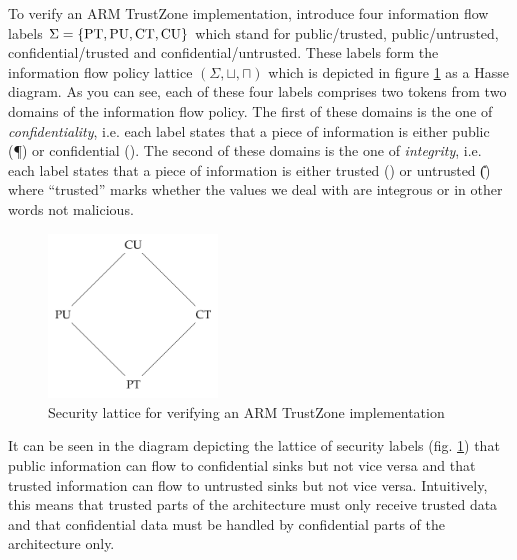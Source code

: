 \begin{example}
    To verify an ARM TrustZone implementation, \citeauthor{Ferraiuolo17} introduce four information flow labels $ \Sigma = \{ \text{PT}, \text{PU}, \text{CT}, \text{CU} \} $ which stand for public/trusted, public/untrusted, confidential/trusted and confidential/untrusted.
    These labels form the information flow policy lattice $ (\Sigma, \sqcup, \sqcap) $ which is depicted in figure \ref{fig:sec-lattice} as a Hasse diagram.
    As you can see, each of these four labels comprises two tokens from two domains of the information flow policy.
    The first of these domains is the one of \textit{confidentiality}, i.e. each label states that a piece of information is either public (\P{}) or confidential (\C{}).
    The second of these domains is the one of \textit{integrity}, i.e. each label states that a piece of information is either trusted (\T{}) or untrusted (\U{}) where \enquote{trusted} marks whether
    the values we deal with are integrous or in other words not malicious.

    \begin{figure}
        \centering
        \includegraphics[width=0.4\textwidth]{figures/ifp-lattice.png}
        \caption{Security lattice for verifying an ARM TrustZone implementation \cite{Ferraiuolo17}}
        \label{fig:sec-lattice}
    \end{figure}

    It can be seen in the diagram depicting the lattice of security labels (fig. \ref{fig:sec-lattice}) that public information can flow to confidential sinks but not vice versa and that trusted information can flow to untrusted sinks but not vice versa.
    Intuitively, this means that trusted parts of the architecture must only receive trusted data and that confidential data must be handled by confidential parts of the architecture only.
\end{example}

